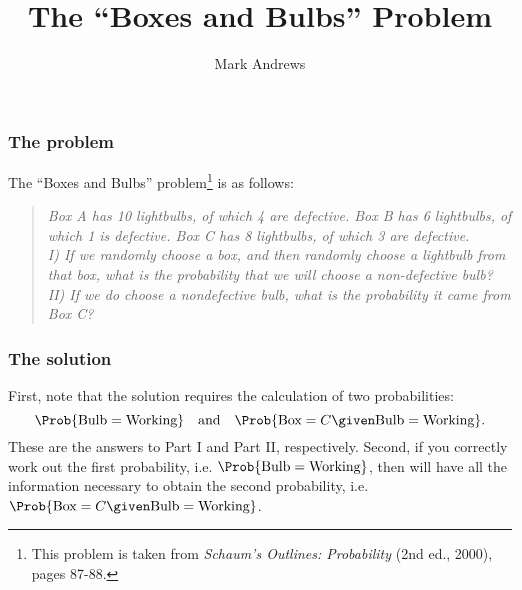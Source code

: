\documentclass{slides}
\title{The ``Boxes and Bulbs'' Problem}
\author[Andrews]{Mark Andrews}
\date{}
\begin{document}
{
	\begin{frame}
		\titlepage
	\end{frame}
}


\begin{frame}
\frametitle{The problem}

The ``Boxes and Bulbs'' problem\footnote{This problem is taken from \emph{Schaum's Outlines: Probability} (2nd ed., 2000), pages 87-88.} is as follows:
\begin{quotation}
{\itshape
Box A has 10 lightbulbs, of which 4 are defective.
Box B has 6 lightbulbs, of which 1 is defective.
Box C has 8 lightbulbs, of which 3 are defective.
\\
I) If we randomly choose a box, and then randomly choose a lightbulb from that box, what is the probability that we will choose a non-defective bulb?
II) If we do choose a nondefective bulb, what is the probability it came from Box C? 
}
\end{quotation}
\end{frame}
%
\begin{frame}
\frametitle{The solution}

First, note that the solution requires the calculation of two probabilities:
\[
\Prob{\text{Bulb}=\text{Working}} \quad\text{and}\quad \Prob{\text{Box}=C\given\text{Bulb}=\text{Working}}.
\]
These are the answers to Part I and Part II, respectively. Second, if you
correctly work out the first probability, i.e.
$\Prob{\text{Bulb}=\text{Working}}$, then will have all the information
necessary to obtain the second probability, i.e.
$\Prob{\text{Box}=C\given\text{Bulb}=\text{Working}}$. 
\end{frame}
\end{document}
